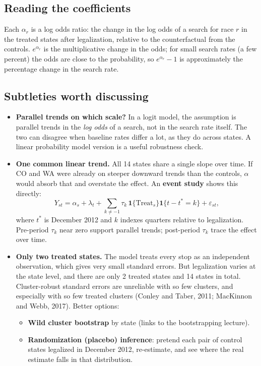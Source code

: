 \documentclass[11pt]{article}
\newcommand{\1}{\mathbf{1}}
\begin{document}
\subsection{Reading the coefficients}
Each $\alpha_r$ is a log odds ratio: the change in the log odds of a search for race $r$ in the treated states after legalization, relative to the counterfactual from the controls. $e^{\alpha_r}$ is the multiplicative change in the odds; for small search rates (a few percent) the odds are close to the probability, so $e^{\alpha_r} - 1$ is approximately the percentage change in the search rate.

\subsection{Subtleties worth discussing}
\begin{itemize}
  \item \textbf{Parallel trends on which scale?} In a logit model, the assumption is parallel trends in the \emph{log odds} of a search, not in the search rate itself. The two can disagree when baseline rates differ a lot, as they do across states. A linear probability model version is a useful robustness check.
  \item \textbf{One common linear trend.} All 14 states share a single slope over time. If CO and WA were already on steeper downward trends than the controls, $\alpha$ would absorb that and overstate the effect. An \textbf{event study} shows this directly:
  \[
  Y_{st} = \alpha_s + \lambda_t + \sum_{k \neq -1} \tau_k\, \1\{\text{Treat}_s\}\1\{t - t^* = k\} + \varepsilon_{st},
  \]
  where $t^*$ is December 2012 and $k$ indexes quarters relative to legalization. Pre-period $\tau_k$ near zero support parallel trends; post-period $\tau_k$ trace the effect over time.
  \item \textbf{Only two treated states.} The model treats every stop as an independent observation, which gives very small standard errors. But legalization varies at the state level, and there are only 2 treated states and 14 states in total. Cluster-robust standard errors are unreliable with so few clusters, and especially with so few treated clusters (Conley and Taber, 2011; MacKinnon and Webb, 2017). Better options:
  \begin{itemize}
    \item \textbf{Wild cluster bootstrap} by state (links to the bootstrapping lecture).
    \item \textbf{Randomization (placebo) inference}: pretend each pair of control states legalized in December 2012, re-estimate, and see where the real estimate falls in that distribution.

\end{itemize}
\end{itemize}
\end{document}
